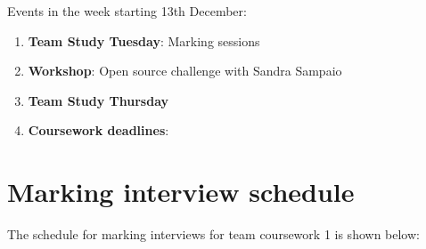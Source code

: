 \documentclass[
]{book}
\providecommand{\tightlist}{%
  \setlength{\itemsep}{0pt}\setlength{\parskip}{0pt}}
\begin{document}
Events in the week starting 13th December:

\begin{enumerate}
\def\labelenumi{\arabic{enumi}.}
\tightlist
\item
  \textbf{Team Study Tuesday}: Marking sessions
\item
  \textbf{Workshop}: Open source challenge with Sandra Sampaio
\item
  \textbf{Team Study Thursday}
\item
  \textbf{Coursework deadlines}:
\end{enumerate}

\hypertarget{mint}{%
\section{Marking interview schedule}\label{mint}}

The schedule for marking interviews for team coursework 1 is shown below:
\end{document}
